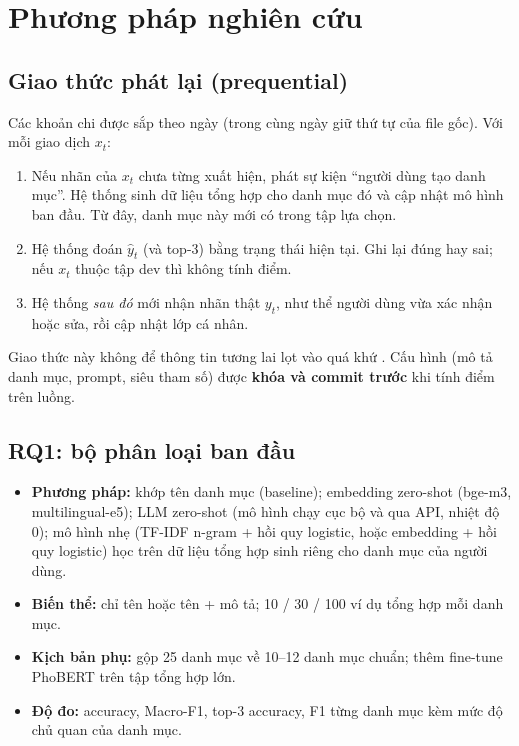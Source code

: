 \documentclass[12pt,a4paper]{article}
\begin{document}
\section{Phương pháp nghiên cứu}

\subsection{Giao thức phát lại (prequential)}\label{sec:replay}
Các khoản chi được sắp theo ngày (trong cùng ngày giữ thứ tự của file gốc). Với mỗi giao dịch $x_t$:
\begin{enumerate}
  \item Nếu nhãn của $x_t$ chưa từng xuất hiện, phát sự kiện ``người dùng tạo danh mục''. Hệ thống sinh dữ liệu tổng hợp cho danh mục đó và cập nhật mô hình ban đầu. Từ đây, danh mục này mới có trong tập lựa chọn.
  \item Hệ thống đoán $\hat y_t$ (và top-3) bằng trạng thái hiện tại. Ghi lại đúng hay sai; nếu $x_t$ thuộc tập dev thì không tính điểm.
  \item Hệ thống \emph{sau đó} mới nhận nhãn thật $y_t$, như thể người dùng vừa xác nhận hoặc sửa, rồi cập nhật lớp cá nhân.
\end{enumerate}
Giao thức này không để thông tin tương lai lọt vào quá khứ \citep{gama2013evaluating}. Cấu hình (mô tả danh mục, prompt, siêu tham số) được \textbf{khóa và commit trước} khi tính điểm trên luồng.

\subsection{RQ1: bộ phân loại ban đầu}\label{sec:rq1}
\begin{itemize}
  \item \textbf{Phương pháp:} khớp tên danh mục (baseline); embedding zero-shot (bge-m3, multilingual-e5); LLM zero-shot (mô hình chạy cục bộ và qua API, nhiệt độ 0); mô hình nhẹ (TF-IDF n-gram + hồi quy logistic, hoặc embedding + hồi quy logistic) học trên dữ liệu tổng hợp sinh riêng cho danh mục của người dùng.
  \item \textbf{Biến thể:} chỉ tên hoặc tên + mô tả; 10 / 30 / 100 ví dụ tổng hợp mỗi danh mục.
  \item \textbf{Kịch bản phụ:} gộp 25 danh mục về 10--12 danh mục chuẩn; thêm fine-tune PhoBERT trên tập tổng hợp lớn.
  \item \textbf{Độ đo:} accuracy, Macro-F1, top-3 accuracy, F1 từng danh mục kèm mức độ chủ quan của danh mục.
\end{itemize}
\end{document}
